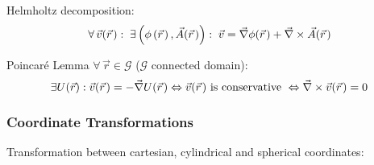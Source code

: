 			\noindent
			Helmholtz decomposition:
			\begin{equation}
				\forall \,\vec{v}(\pvec{r}):\; \exists\left(\phi\left(\pvec{r}\right),\vec{A}(\pvec{r})\right):\;\vec{v} = \Nabla\phi(\pvec{r}) + 	\Nabla\times\vec{A}(\pvec{r})
			\end{equation}

			\noindent
			Poincaré Lemma $\forall\, \vec{r}\in\mathcal{G}$ ($\mathcal{G}$ connected domain):
			\begin{equation}
				\exists U(\vec{r}): \vec{v}(\pvec{r}) = -\Nabla U(\pvec{r})
				\Leftrightarrow \vec{v}(\pvec{r}) \text{ is conservative }
				\Leftrightarrow \Nabla\times\vec{v}(\pvec{r}) = 0
			\end{equation}

		\subsubsection{Coordinate Transformations}
			\noindent
			Transformation between cartesian, cylindrical and spherical coordinates:
